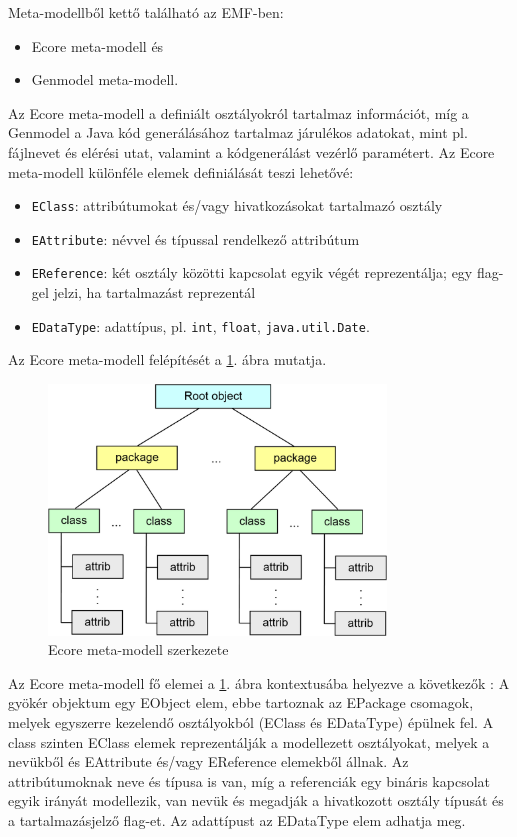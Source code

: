 Meta-modellből kettő található az \gls{EMF}-ben:
\begin{itemize}
	\item Ecore meta-modell és 
	\item Genmodel meta-modell.
\end{itemize}
Az Ecore meta-modell a definiált osztályokról tartalmaz információt, míg a Genmodel a Java kód generálásához tartalmaz járulékos adatokat, mint pl. fájlnevet és elérési utat, valamint a kódgenerálást vezérlő paramétert.
Az Ecore meta-modell különféle elemek definiálását teszi lehetővé:
\begin{itemize}
	\item \texttt{EClass}: attribútumokat és/vagy hivatkozásokat tartalmazó osztály
	\item \texttt{EAttribute}: névvel és típussal rendelkező attribútum
	\item \texttt{EReference}: két osztály közötti kapcsolat egyik végét reprezentálja; egy flag-gel jelzi, ha tartalmazást reprezentál
	\item \texttt{EDataType}: adattípus, pl. \texttt{int}, \texttt{float}, \texttt{java.util.Date}.
\end{itemize}
%
Az Ecore meta-modell felépítését a \ref{fig:EcoreStruct}. ábra mutatja.
%
\begin{figure}[htb]
\centering
\includegraphics[width=0.8\textwidth]{figures/ecore-metamodel-struct.png}
\caption{Ecore meta-modell szerkezete}
\label{fig:EcoreStruct}
\end{figure}
%
Az Ecore meta-modell fő elemei a \ref{fig:EcoreStruct}. ábra kontextusába helyezve a következők \cite{EMFFundamentals}: 
A gyökér objektum egy EObject elem, ebbe tartoznak az EPackage csomagok, melyek egyszerre kezelendő osztályokból (EClass és EDataType) épülnek fel.
A class szinten EClass elemek reprezentálják a modellezett osztályokat, melyek a nevükből és EAttribute és/vagy EReference elemekből állnak.
Az attribútumoknak neve és típusa is van, míg a referenciák egy bináris kapcsolat egyik irányát modellezik, van nevük és megadják a hivatkozott osztály típusát és a tartalmazásjelző flag-et.
Az adattípust az EDataType elem adhatja meg.  

